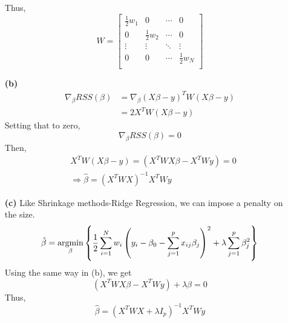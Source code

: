 \documentclass[10pt]{article}
\begin{document}
\begin{enumerate}[1.]
$$		$$
		Thus, 
		$$
		W = \begin{bmatrix}
			\frac{1}{2}w_1 &0  & \cdots   & 0  \\
			0 & \frac{1}{2}w_2  & \cdots   & 0  \\
			\vdots & \vdots  & \ddots   & \vdots  \\
			0 & 0  & \cdots  & \frac{1}{2}w_N \\
			\end{bmatrix}
		$$
		\item[\textbf{(b)}] 
		$$
		\begin{aligned}
			\nabla_{\beta} RSS(\beta) &=\nabla_{\beta} (X\beta-y)^T W (X\beta-y)
			\\&=2X^T W (X\beta-y)
		\end{aligned}
		$$
		Setting that to zero, 
		$$\nabla_{\beta} RSS(\beta) = 0$$
		Then, 
		$$
		\begin{aligned}
			&X^T W (X\beta-y) =  (X^T W X\beta- X^T Wy) = 0
			\\&\Rightarrow \hat{\beta} = (X^T W X)^{-1}X^T Wy
		\end{aligned}
		$$
		\item[\textbf{(c)}] 
		Like Shrinkage methods-Ridge Regression, we can impose a penalty on the size.
		$$\hat{\beta} = \underset{\beta}{\mathop{\rm argmin}}\left\{\frac{1}{2}\sum_{i=1}^{N}w_i\left(y_{i}-\beta_{0}-\sum_{j=1}^{p} x_{i j} \beta_{j}\right)^{2}+\lambda \sum_{j=1}^{p} \beta_j ^2\right\}$$ 
		Using the same way in (b), we get
		$$(X^T W X\beta- X^T Wy)+\lambda \beta = 0$$
		Thus, 
		$$\hat{\beta} = (X^T W X+\lambda I_p)^{-1}X^T Wy$$
	\end{enumerate}
\end{document}
